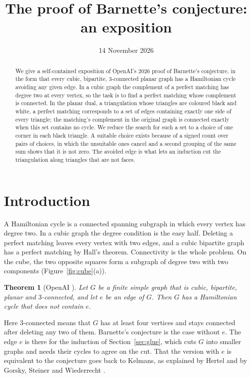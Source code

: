 \documentclass[10pt]{amsart}
\title[Barnette's conjecture]{The proof of Barnette's conjecture: an exposition}
\author{}
\date{14 November 2026}
\numberwithin{equation}{section}
\newtheorem{theorem}[equation]{Theorem}
\theoremstyle{definition}
\theoremstyle{remark}
\begin{document}
\begin{abstract}
We give a self-contained exposition of OpenAI's 2026 proof of Barnette's conjecture, in the form that every cubic, bipartite, 3-connected planar graph has a Hamiltonian cycle avoiding any given edge.
In a cubic graph the complement of a perfect matching has degree two at every vertex, so the task is to find a perfect matching whose complement is connected.
In the planar dual, a triangulation whose triangles are coloured black and white, a perfect matching corresponds to a set of edges containing exactly one side of every triangle; the matching's complement in the original graph is connected exactly when this set contains no cycle.
We reduce the search for such a set to a choice of one corner in each black triangle.
A suitable choice exists because of a signed count over pairs of choices, in which the unsuitable ones cancel and a second grouping of the same sum shows that it is not zero.
The avoided edge is what lets an induction cut the triangulation along triangles that are not faces.
\end{abstract}
\maketitle
\raggedbottom

\section{Introduction}

A Hamiltonian cycle is a connected spanning subgraph in which every vertex has degree two.
In a cubic graph the degree condition is the easy half.
Deleting a perfect matching leaves every vertex with two edges, and a cubic bipartite graph has a perfect matching by Hall's theorem.
Connectivity is the whole problem.
On the cube, the two opposite squares form a subgraph of degree two with two components (Figure~\ref{fig:cube}(a)).

\begin{theorem}[OpenAI {\cite[Theorem~1.1 and Corollary~7.1]{OpenAI2026}}]\label{thm:main}
Let $G$ be a finite simple graph that is cubic, bipartite, planar and $3$-connected, and let $e$ be an edge of $G$.
Then $G$ has a Hamiltonian cycle that does not contain $e$.
\end{theorem}

Here $3$-connected means that $G$ has at least four vertices and stays connected after deleting any two of them.
Barnette's conjecture is the case without $e$.
The edge $e$ is there for the induction of Section~\ref{sec:glue}, which cuts $G$ into smaller graphs and needs their cycles to agree on the cut.
That the version with $e$ is equivalent to the conjecture goes back to Kelmans, as explained by Hertel \cite[Corollary~3]{Hertel2005} and by Gorsky, Steiner and Wiederrecht \cite[Theorem~4.3]{Gorsky2023}.
\end{document}
